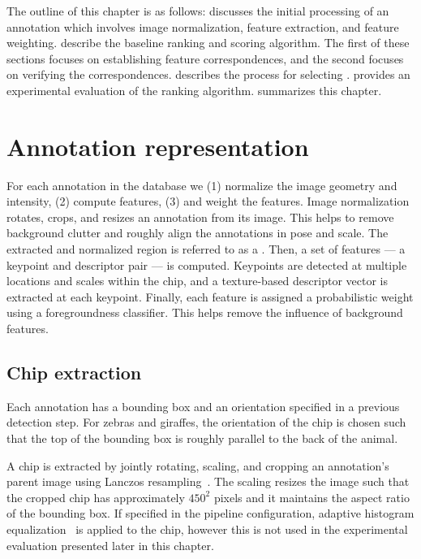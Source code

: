     The outline of this chapter is as follows:  discusses the initial processing of an
    annotation which involves image normalization, feature extraction, and feature weighting.
     describe the baseline ranking and scoring algorithm. The first of these
    sections focuses on establishing feature correspondences, and the second focuses on verifying the
    correspondences.  describes the process for selecting \exemplars{}.
     provides an experimental evaluation of the ranking algorithm.
     summarizes this chapter.

    \rankedmatches{}

\section{Annotation representation}\label{sec:annotrepr}
  
    For each annotation in the database we (1) normalize the image geometry and intensity, (2) compute features,
    (3) and weight the features.
    Image normalization rotates, crops, and resizes an annotation from its image. This helps to remove background
    clutter and roughly align the annotations in pose and scale. The extracted and normalized region is referred to
    as a .
    Then, a set of features ---  a keypoint and descriptor pair --- is computed. Keypoints are detected at multiple
    locations and scales within the chip, and a texture-based descriptor vector is extracted at each keypoint.
    Finally, each feature is assigned a probabilistic weight using a foregroundness classifier. This helps remove
    the influence of background features.

    \subsection{Chip extraction}

        Each annotation has a bounding box and an orientation specified in a previous detection step. For zebras
        and giraffes, the orientation of the chip is chosen such that the top of the bounding box is roughly
        parallel to the back of the animal.

        A chip is extracted by jointly rotating, scaling, and cropping an annotation's parent image using Lanczos
        resampling~\cite{lanczos_applied_1988}. The scaling resizes the image such that the cropped chip has
        approximately $450^2$ pixels and it maintains the aspect ratio of the bounding box. If specified in the
        pipeline configuration, adaptive histogram equalization~\cite{pizer_adaptive_1987} is applied to the chip,
        however this is not used in the experimental evaluation presented later in this chapter.

